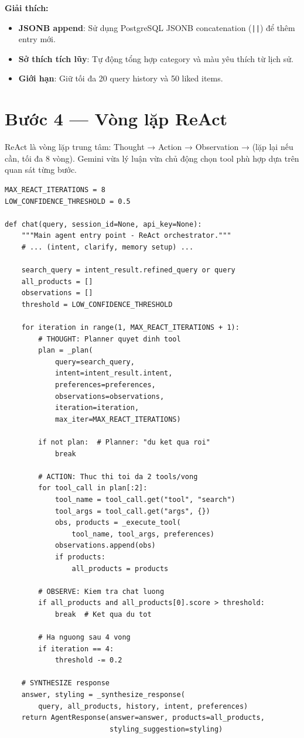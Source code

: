 \documentclass[12pt,a4paper]{report}
\begin{document}
\textbf{Giải thích:}
\begin{itemize}
    \item \textbf{JSONB append}: Sử dụng PostgreSQL JSONB concatenation (\texttt{||}) để thêm entry mới.
    \item \textbf{Sở thích tích lũy}: Tự động tổng hợp category và màu yêu thích từ lịch sử.
    \item \textbf{Giới hạn}: Giữ tối đa 20 query history và 50 liked items.
\end{itemize}

\section{Bước 4 --- Vòng lặp ReAct}

\begin{tcolorbox}[title=Phương pháp: ReAct (Reason + Act) Loop]
ReAct là vòng lặp trung tâm: Thought → Action → Observation → (lặp lại nếu cần, tối đa 8 vòng). Gemini vừa lý luận vừa chủ động chọn tool phù hợp dựa trên quan sát từng bước.
\end{tcolorbox}

\begin{lstlisting}[caption={ReAct Loop --- agent/fashion\_agent.py}]
MAX_REACT_ITERATIONS = 8
LOW_CONFIDENCE_THRESHOLD = 0.5

def chat(query, session_id=None, api_key=None):
    """Main agent entry point - ReAct orchestrator."""
    # ... (intent, clarify, memory setup) ...

    search_query = intent_result.refined_query or query
    all_products = []
    observations = []
    threshold = LOW_CONFIDENCE_THRESHOLD

    for iteration in range(1, MAX_REACT_ITERATIONS + 1):
        # THOUGHT: Planner quyet dinh tool
        plan = _plan(
            query=search_query,
            intent=intent_result.intent,
            preferences=preferences,
            observations=observations,
            iteration=iteration,
            max_iter=MAX_REACT_ITERATIONS)

        if not plan:  # Planner: "du ket qua roi"
            break

        # ACTION: Thuc thi toi da 2 tools/vong
        for tool_call in plan[:2]:
            tool_name = tool_call.get("tool", "search")
            tool_args = tool_call.get("args", {})
            obs, products = _execute_tool(
                tool_name, tool_args, preferences)
            observations.append(obs)
            if products:
                all_products = products

        # OBSERVE: Kiem tra chat luong
        if all_products and all_products[0].score > threshold:
            break  # Ket qua du tot

        # Ha nguong sau 4 vong
        if iteration == 4:
            threshold -= 0.2

    # SYNTHESIZE response
    answer, styling = _synthesize_response(
        query, all_products, history, intent, preferences)
    return AgentResponse(answer=answer, products=all_products,
                         styling_suggestion=styling)
\end{lstlisting}
\end{document}
